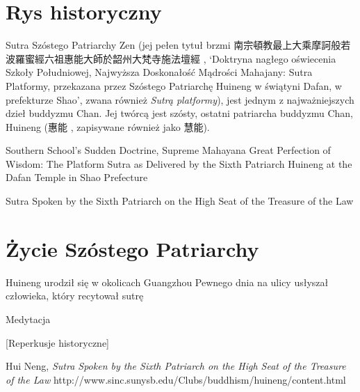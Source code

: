 \maketitle

\section{Rys historyczny}

Sutra Szóstego Patriarchy Zen (jej pełen tytuł brzmi 南宗頓教最上大乘摩訶般若波羅蜜經六祖惠能大師於韶州大梵寺施法壇經 , `Doktryna nagłego oświecenia Szkoły Południowej, Najwyższa Doskonałość Mądrości Mahajany: Sutra Platformy, przekazana przez Szóstego Patriarchę Huineng w świątyni Dafan, w prefekturze Shao', zwana również \emph{Sutrą platformy}), jest jednym z najważniejszych dzieł buddyzmu Chan. Jej twórcą jest szósty, ostatni patriarcha buddyzmu Chan, Huineng (惠能 , zapisywane również jako 慧能).

Southern School's Sudden Doctrine, Supreme Mahayana Great Perfection of Wisdom: The Platform Sutra as Delivered by the Sixth Patriarch Huineng at the Dafan Temple in Shao Prefecture

Sutra Spoken by the Sixth Patriarch on the High Seat of the Treasure of the Law

\section{Życie Szóstego Patriarchy}
Huineng urodził się w okolicach Guangzhou
Pewnego dnia na ulicy usłyszał człowieka, który recytował sutrę

Medytacja

[Reperkusje historyczne]


Hui Neng, \emph{Sutra Spoken by the Sixth Patriarch on the High Seat of the Treasure of the Law} http://www.sinc.sunysb.edu/Clubs/buddhism/huineng/content.html
